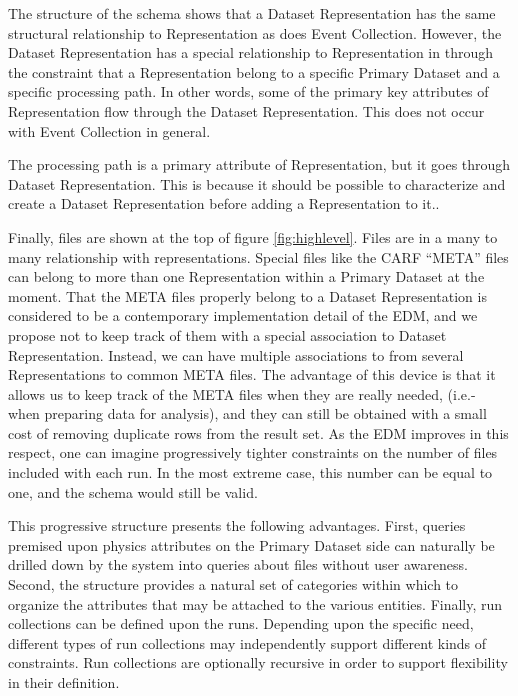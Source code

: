 \documentclass{cmspaper}
\begin{document}
The structure of the schema shows that a Dataset Representation has the same 
structural relationship to Representation as does Event Collection.  However,
the Dataset Representation has a special relationship to Representation in through 
the constraint that a Representation belong to a specific Primary Dataset and a 
specific processing path.  In other words, some of the primary key attributes 
of Representation flow through the Dataset Representation.  This does not occur 
with Event Collection in general.

The processing path is a primary attribute of Representation, but it goes through 
Dataset Representation.  This is because it should be possible to characterize and
create a Dataset Representation before adding a Representation to it..  

Finally, files are shown at the top of figure \ref{fig:highlevel}. Files are in a many to 
many relationship with representations.  Special files like the CARF ``META'' files
can belong to more than one Representation within a Primary Dataset at the moment.
That the META files properly belong to a Dataset Representation is considered to 
be a contemporary  implementation detail of the EDM, and we propose not to keep track 
of them with a special association to Dataset Representation.  Instead, we can have 
multiple associations to from several Representations to common META files.  The 
advantage of this 
device is that it allows us to keep track of the META files when they are really needed, 
(i.e.- when preparing data for analysis), and they can still be obtained with a 
small cost of removing duplicate rows from the result set.  As the EDM improves in this 
respect, one can imagine progressively tighter constraints on the number of files included 
with each run.   In the most extreme case, this number can be equal to one, and the schema 
would still be valid.

This progressive structure presents the following advantages.  First, queries 
premised upon physics attributes on the Primary Dataset side 
can naturally be drilled down by the system into queries about files without user awareness.
Second,  the structure provides a natural set of categories within which to organize the 
attributes that may be attached to the various entities.  Finally, run collections can be 
defined upon the runs.  Depending upon the specific need, different types of run collections 
may independently support different kinds of constraints.  Run collections are optionally 
recursive in order to support flexibility in their definition.
\end{document}
